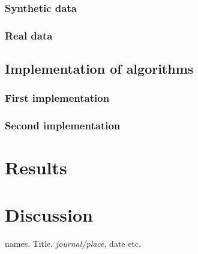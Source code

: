 \documentclass{report}
\begin{document}
\subsection{Synthetic data}
\subsection{Real data}

\section{Implementation of algorithms}
\subsection{First implementation}
\subsection{Second implementation}

\chapter{Results}
 \vspace{-0.6cm}
\chapter{Discussion}
 \vspace{-0.6cm}



 \renewcommand\bibname{References}
 \begin{thebibliography}{1}
 \vspace{-0.6cm}
   names. Title. {\em journal/place}, date etc.





  \end{thebibliography}
\end{document}
